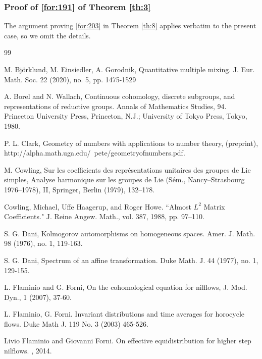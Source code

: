 \documentclass[11 pt]{amsart}
\theoremstyle{definition}
\numberwithin{equation}{section}
\begin{document}
\subsubsection{Proof of \eqref{for:191} of Theorem \ref{th:3}}
The argument proving \eqref{for:203} in Theorem \ref{th:8} applies verbatim to the present case, so we omit the details.





\begin{thebibliography}{99}

 M. Bj{\"o}rklund, M. Einsiedler, A. Gorodnik, Quantitative multiple mixing. J. Eur. Math. Soc. 22 (2020), no. 5, pp. 1475-1529

A. Borel and N. Wallach, Continuous cohomology, discrete subgroups, and representations of reductive
groups. Annals of Mathematics Studies, 94. Princeton University Press, Princeton, N.J.; University of
Tokyo Press, Tokyo, 1980.

 P. L. Clark, Geometry of numbers with applications to number theory, (preprint),
http://alpha.math.uga.edu/~pete/geometryofnumbers.pdf.

 M. Cowling, Sur les coefficients des représentations unitaires des groupes de Lie simples, Analyse harmonique
sur les groupes de Lie (Sém., Nancy–Strasbourg 1976–1978), II, Springer, Berlin (1979), 132–178.

 Cowling, Michael, Uffe Haagerup, and Roger Howe. ``Almost $L^2$ Matrix Coefficients."  J. Reine Angew. Math., vol. 387, 1988, pp. 97–110.


 S. G. Dani, Kolmogorov automorphisms on homogeneous spaces. Amer. J. Math. 98 (1976), no. 1, 119-163.

 S. G. Dani, Spectrum of an affine transformation. Duke Math. J. 44 (1977), no. 1, 129-155.







 L. Flaminio and G. Forni, On the cohomological equation for nilflows, J. Mod. Dyn., 1 (2007), 37-60.

L. Flaminio, G. Forni. Invariant distributions and time averages for horocycle flows. Duke Math
J. 119 No. 3 (2003) 465-526.

Livio Flaminio and Giovanni Forni.
\newblock On effective equidistribution for higher step nilflows.
, 2014.


\end{thebibliography}
\end{document}
